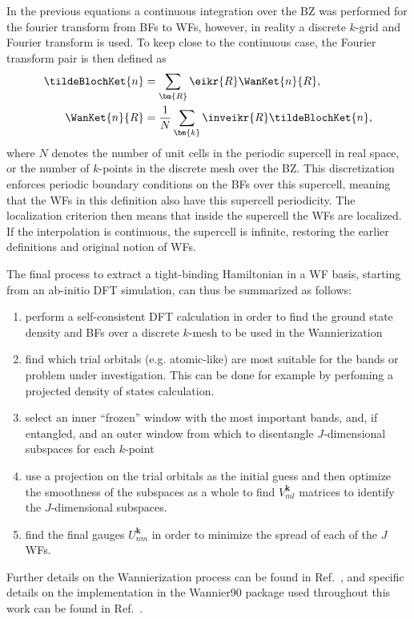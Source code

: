 In the previous equations a continuous integration over the BZ was performed for the fourier transform from BFs to WFs, however, in reality a discrete $k$-grid and Fourier transform is used.
To keep close to the continuous case, the Fourier transform pair is then defined as
\begin{align}
	\tildeBlochKet{n} &= \sum_{\bm{R}} \eikr{R} \WanKet{n}{R},\label{eq:Theory_wantok}\\
	\WanKet{n}{R} &= \frac{1}{N}\sum_{\bm{k}} \inveikr{R} \tildeBlochKet{n},
\end{align}
where $N$ denotes the number of unit cells in the periodic supercell in real space, or the number of $k$-points in the discrete mesh over the BZ.
This discretization enforces periodic boundary conditions on the BFs over this supercell, meaning that the WFs in this definition also have this supercell periodicity.
The localization criterion then means that inside the supercell the WFs are localized.
If the interpolation is continuous, the supercell is infinite, restoring the earlier definitions and original notion of WFs.

The final process to extract a tight-binding Hamiltonian in a WF basis, starting from an ab-initio DFT simulation, can thus be summarized as follows:
\begin{enumerate}
	\item perform a self-consistent DFT calculation in order to find the ground state density and BFs over a discrete $k$-mesh to be used in the Wannierization
	\item find which trial orbitals (e.g. atomic-like) are most suitable for the bands or problem under investigation. This can be done for example by perfoming a projected density of states calculation.
	\item select an inner ``frozen'' window with the most important bands, and, if entangled, and an outer window from which to disentangle $J$-dimensional subspaces for each $k$-point
	\item use a projection on the trial orbitals as the initial guess and then optimize the smoothness of the subspaces as a whole to find $V_{ml}^{\bm{k}}$ matrices to identify the $J$-dimensional subspaces.
	\item find the final gauges $U_{nm}^{\bm{k}}$ in order to minimize the spread of each of the $J$ WFs.
\end{enumerate}

Further details on the Wannierization process can be found in Ref.~\cite{Marzari2012}, and specific details on the implementation in the Wannier90 package used throughout this work can be found in Ref.~\cite{Mostofi2014AnFunctions}.

